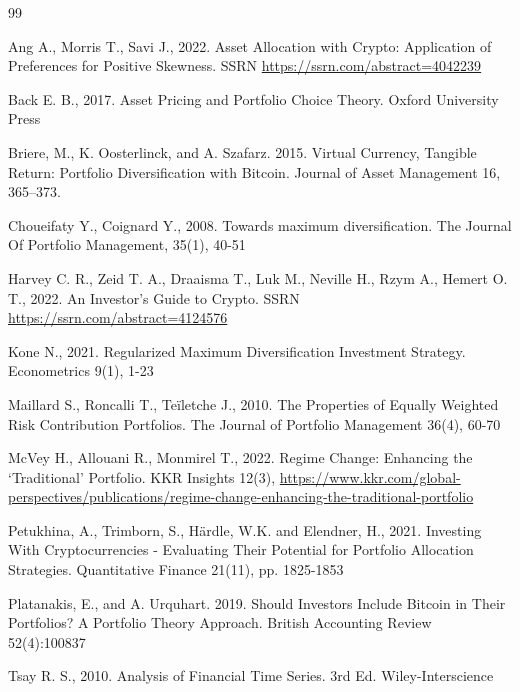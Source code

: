 \documentclass[pdftex,11pt,a4paper] {article}
\begin{document}
\begin{thebibliography}{99}


 Ang A., Morris T., Savi J., 2022. Asset Allocation with Crypto: Application of Preferences for Positive Skewness. SSRN \href{https://ssrn.com/abstract=4042239}{https://ssrn.com/abstract=4042239}


 Back E. B., 2017. Asset Pricing and Portfolio Choice Theory. Oxford University Press


 Briere, M., K. Oosterlinck, and A. Szafarz. 2015. Virtual Currency, Tangible Return: Portfolio Diversification with Bitcoin. Journal of Asset Management 16, 365–373.




 Choueifaty Y., Coignard Y., 2008. Towards maximum diversification. The Journal Of Portfolio Management, 35(1), 40-51


 Harvey C. R., Zeid T. A., Draaisma T., Luk M., Neville H., Rzym A., Hemert O. T., 2022. An Investor’s Guide to Crypto. SSRN \href{https://ssrn.com/abstract=4124576}{https://ssrn.com/abstract=4124576}


 Kone N., 2021. Regularized Maximum Diversification Investment Strategy. Econometrics 9(1), 1-23


 Maillard S., Roncalli T., Teïletche J., 2010. The Properties of Equally Weighted Risk Contribution Portfolios. The Journal of Portfolio Management 36(4), 60-70


 McVey H., Allouani R., Monmirel T., 2022. Regime Change: Enhancing the ‘Traditional’ Portfolio. KKR Insights 12(3), \href{https://www.kkr.com/global-perspectives/publications/regime-change-enhancing-the-traditional-portfolio}{https://www.kkr.com/global-perspectives/publications/regime-change-enhancing-the-traditional-portfolio}


 Petukhina, A., Trimborn, S., Härdle, W.K. and Elendner, H., 2021. Investing With Cryptocurrencies - Evaluating Their Potential for Portfolio Allocation Strategies. Quantitative Finance 21(11), pp. 1825-1853


 Platanakis, E., and A. Urquhart. 2019. Should Investors Include Bitcoin in Their Portfolios? A Portfolio Theory Approach. British Accounting Review 52(4):100837




 Tsay R. S., 2010. Analysis of Financial Time Series. 3rd Ed. Wiley-Interscience

\end{thebibliography}
\end{document}
